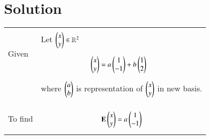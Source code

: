 \documentclass[journal,12pt]{IEEEtran}
\begin{document}
\section{\textbf{Solution}}
\renewcommand{\thetable}{1}
\begin{longtable}{|p{4cm}|p{14cm}|}
\hline
\multirow{3}{*}{Given} 
    	& \\
     	&  Let $\begin{pmatrix}x\\y\end{pmatrix} \in \mathbb{R}^{2}$\\
     	&{\begin{align}\label{eq1}
     	& \begin{pmatrix}x\\y\end{pmatrix} = a\begin{pmatrix}1\\-1\end{pmatrix} +b\begin{pmatrix}1\\2\end{pmatrix}
     	\end{align}}\\
     	& where $\begin{pmatrix}a\\b\end{pmatrix}$ is representation of $\begin{pmatrix}x\\y\end{pmatrix}$ in new basis.\\
     	&\\
\hline
\multirow{3}{*}{To find} 
     	&\\
        &{\begin{align}\label{eq2}
        \mathbf{E}\begin{pmatrix}x\\y\end{pmatrix} = a\begin{pmatrix}1\\-1\end{pmatrix}
        \end{align}}\\
     	

\end{longtable}
\end{document}
